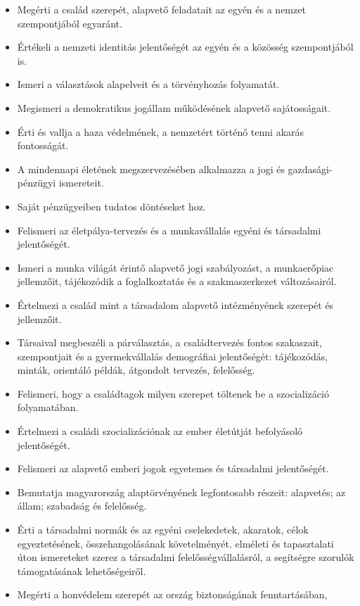 \begin{itemize}
\item
  Megérti a család szerepét, alapvető feladatait az egyén és a nemzet
  szempontjából egyaránt.
\item
  Értékeli a nemzeti identitás jelentőségét az egyén és a közösség
  szempontjából is.
\item
  Ismeri a választások alapelveit és a törvényhozás folyamatát.
\item
  Megismeri a demokratikus jogállam működésének alapvető sajátosságait.
\item
  Érti és vallja a haza védelmének, a nemzetért történő tenni akarás
  fontosságát.
\item
  A mindennapi életének megszervezésében alkalmazza a jogi és
  gazdasági-pénzügyi ismereteit.
\item
  Saját pénzügyeiben tudatos döntéseket hoz.
\item
  Felismeri az életpálya-tervezés és a munkavállalás egyéni és
  társadalmi jelentőségét.
\item
  Ismeri a munka világát érintő alapvető jogi szabályozást, a
  munkaerőpiac jellemzőit, tájékozódik a foglalkoztatás és a
  szakmaszerkezet változásairól.
\item
  Értelmezi a család mint a társadalom alapvető intézményének szerepét
  és jellemzőit.
\item
  Társaival megbeszéli a párválasztás, a családtervezés fontos
  szakaszait, szempontjait és a gyermekvállalás demográfiai
  jelentőségét: tájékozódás, minták, orientáló példák, átgondolt
  tervezés, felelősség.
\item
  Felismeri, hogy a családtagok milyen szerepet töltenek be a
  szocializáció folyamatában.
\item
  Értelmezi a családi szocializációnak az ember életútját befolyásoló
  jelentőségét.
\item
  Felismeri az alapvető emberi jogok egyetemes és társadalmi
  jelentőségét.
\item
  Bemutatja magyarország alaptörvényének legfontosabb részeit:
  alapvetés; az állam; szabadság és felelősség.
\item
  Érti a társadalmi normák és az egyéni cselekedetek, akaratok, célok
  egyeztetésének, összehangolásának követelményét. elméleti és
  tapasztalati úton ismereteket szerez a társadalmi
  felelősségvállalásról, a segítségre szorulók támogatásának
  lehetőségeiről.
\item
  Megérti a honvédelem szerepét az ország biztonságának fenntartásában,

\end{itemize}
